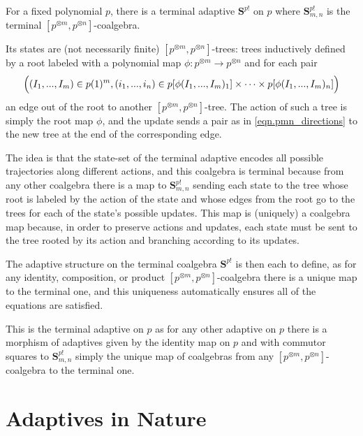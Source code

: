 \documentclass[11pt, one side, article]{memoir}
\theoremstyle{definition}
\theoremstyle{plain}
\newenvironment{example}
  {\pushQED{\qed}\renewcommand{\qedsymbol}{$\lozenge$}\examplex}
  {\popQED\endexamplex}
\newcommand{\Cat}[1]{\mathbf{#1}}%
\newcommand{\0}{\textsf{0}}
\newcommand{\1}{\tn{\textsf{1}}}
\renewcommand{\S}{{\Cat{S}}}
\newcommand{\blp}{\Big{(}}
\newcommand{\brp}{\Big{)}}
\begin{document}

\begin{example}
For a fixed polynomial $p$, there is a terminal adaptive $\S^{p!}$ on $p$ where $\S^{p!}_{m,n}$ is the terminal $[p^{\otimes m},p^{\otimes n}]$-coalgebra. 

Its states are (not necessarily finite) $[p^{\otimes m},p^{\otimes n}]$-trees: trees inductively defined by a root labeled with a polynomial map $\phi : p^{\otimes m} \to p^{\otimes n}$ and for each pair 
\begin{equation}\label{eqn.pmn_directions}
\blp(I_1,...,I_m) \in p(1)^m, (i_1,...,i_n) \in p[\phi(I_1,...,I_m)_1] \times \cdots \times p[\phi(I_1,...,I_m)_n]\brp
\end{equation}
an edge out of the root to another $[p^{\otimes m},p^{\otimes n}]$-tree. The action of such a tree is simply the root map $\phi$, and the update sends a pair as in \eqref{eqn.pmn_directions} to the new tree at the end of the corresponding edge. 

The idea is that the state-set of the terminal adaptive encodes all possible trajectories along different actions, and this coalgebra is terminal because from any other coalgebra there is a map to $\S^{p!}_{m,n}$ sending each state to the tree whose root is labeled by the action of the state and whose edges from the root go to the trees for each of the state's possible updates. This map is (uniquely) a coalgebra map because, in order to preserve actions and updates, each state must be sent to the tree rooted by its action and branching according to its updates.

The adaptive structure on the terminal coalgebra $\S^{p!}$ is then each to define, as for any identity, composition, or product $[p^{\otimes m},p^{\otimes n}]$-coalgebra there is a unique map to the terminal one, and this uniqueness automatically ensures all of the equations are satisfied. 

This is the terminal adaptive on $p$ as for any other adaptive on $p$ there is a morphism of adaptives given by the identity map on $p$ and with commutor squares to $\S^{p!}_{m,n}$ simply the unique map of coalgebras from any $[p^{\otimes m},p^{\otimes n}]$-coalgebra to the terminal one.
\end{example}


\chapter{Adaptives in Nature}
\end{document}
